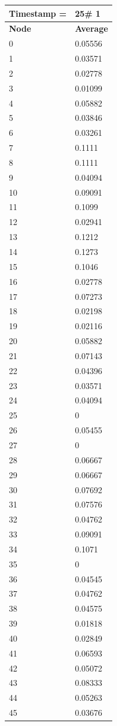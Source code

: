 \begin{tabular}{|l||l|}
\hline
\textbf{Timestamp =} & \textbf{25}\# 1\\\hline
	\textbf{Node} & \textbf{Average} \\ \hline
\hline
	0 & 0.05556 \\ \hline
	1 & 0.03571 \\ \hline
	2 & 0.02778 \\ \hline
	3 & 0.01099 \\ \hline
	4 & 0.05882 \\ \hline
	5 & 0.03846 \\ \hline
	6 & 0.03261 \\ \hline
	7 & 0.1111 \\ \hline
	8 & 0.1111 \\ \hline
	9 & 0.04094 \\ \hline
	10 & 0.09091 \\ \hline
	11 & 0.1099 \\ \hline
	12 & 0.02941 \\ \hline
	13 & 0.1212 \\ \hline
	14 & 0.1273 \\ \hline
	15 & 0.1046 \\ \hline
	16 & 0.02778 \\ \hline
	17 & 0.07273 \\ \hline
	18 & 0.02198 \\ \hline
	19 & 0.02116 \\ \hline
	20 & 0.05882 \\ \hline
	21 & 0.07143 \\ \hline
	22 & 0.04396 \\ \hline
	23 & 0.03571 \\ \hline
	24 & 0.04094 \\ \hline
	25 & 0 \\ \hline
	26 & 0.05455 \\ \hline
	27 & 0 \\ \hline
	28 & 0.06667 \\ \hline
	29 & 0.06667 \\ \hline
	30 & 0.07692 \\ \hline
	31 & 0.07576 \\ \hline
	32 & 0.04762 \\ \hline
	33 & 0.09091 \\ \hline
	34 & 0.1071 \\ \hline
	35 & 0 \\ \hline
	36 & 0.04545 \\ \hline
	37 & 0.04762 \\ \hline
	38 & 0.04575 \\ \hline
	39 & 0.01818 \\ \hline
	40 & 0.02849 \\ \hline
	41 & 0.06593 \\ \hline
	42 & 0.05072 \\ \hline
	43 & 0.08333 \\ \hline
	44 & 0.05263 \\ \hline
	45 & 0.03676 \\ \hline
\end{tabular}
